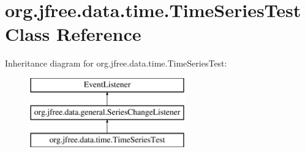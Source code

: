 \hypertarget{classorg_1_1jfree_1_1data_1_1time_1_1_time_series_test}{}\section{org.\+jfree.\+data.\+time.\+Time\+Series\+Test Class Reference}
\label{classorg_1_1jfree_1_1data_1_1time_1_1_time_series_test}
Inheritance diagram for org.\+jfree.\+data.\+time.\+Time\+Series\+Test\+:\begin{figure}[H]
\begin{center}
\leavevmode
\includegraphics[height=3.000000cm]{classorg_1_1jfree_1_1data_1_1time_1_1_time_series_test}
\end{center}
\end{figure}
